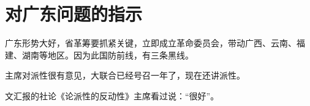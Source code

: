 \section[对广东问题的指示（一九六八年二月）]{对广东问题的指示}


广东形势大好，省革筹要抓紧关键，立即成立革命委员会，带动广西、云南、福建、湖南等地区。因为此国防前线，有三条黑线。

主席对派性很有意见，大联合已经号召一年了，现在还讲派性。

文汇报的社论《论派性的反动性》主席看过说：“很好”。


